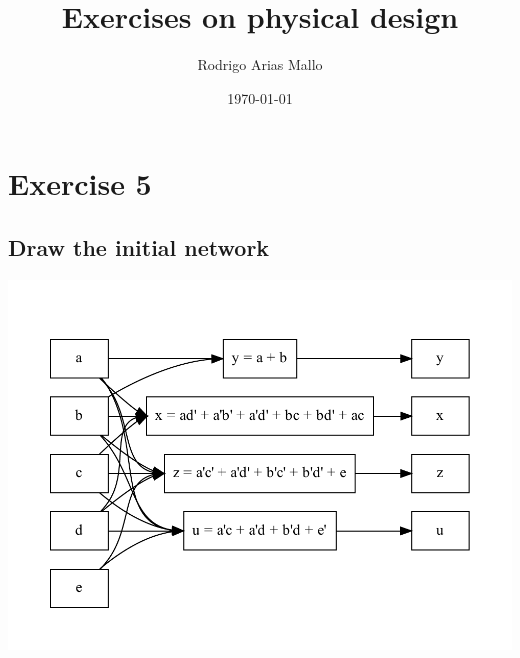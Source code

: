 \documentclass[a4paper]{article}
\title{Exercises on physical design}
\author{Rodrigo Arias Mallo}
\date{\today}
\begin{document}
\maketitle

\section{Exercise 5}

\subsection{Draw the initial network}
%
\begin{center}
\includegraphics[scale=.5]{5a-graph.pdf}
\end{center}
%
\end{document}
